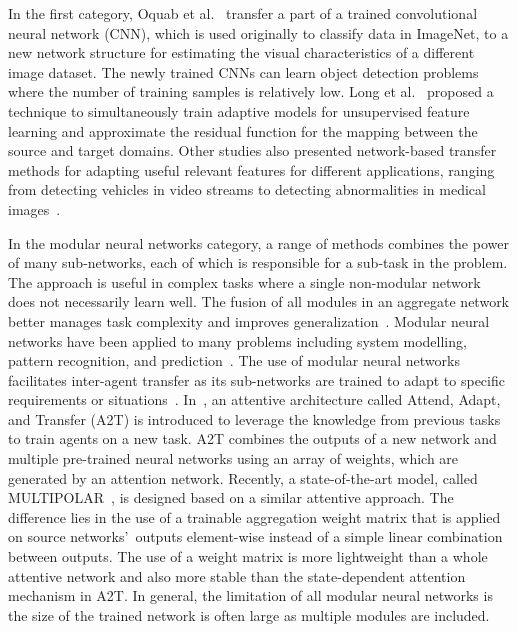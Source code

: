 \documentclass[lettersize,journal]{IEEEtran}
\begin{document}
In the first category, Oquab et al.~\cite{oquab2014learning} transfer a part of a trained convolutional neural network (CNN), which is used originally to classify data in ImageNet, to a new network structure for estimating the visual characteristics of a different image dataset. The newly trained CNNs can learn object detection problems where the number of training samples is relatively low. Long et al.~\cite{long2016unsupervised} proposed a technique to simultaneously train adaptive models for unsupervised feature learning and approximate the residual function for the mapping between the source and target domains. Other studies also presented network-based transfer methods for adapting useful relevant features for different applications, ranging from detecting vehicles in video streams to detecting abnormalities in medical images~\cite{wang2018vehicle,zhu2016deep,hassan2020developing}.

In the modular neural networks category, a range of methods combines the power of many sub-networks, each of which is responsible for a sub-task in the problem. The approach is useful in complex tasks where a single non-modular network does not necessarily learn well. The fusion of all modules in an aggregate network better manages task complexity and improves generalization~\cite{hu2020classifier}. Modular neural networks have been applied to many problems including system modelling, pattern recognition, and prediction~\cite{hu2020classifier,qiao2018design,li2019design}. The use of modular neural networks facilitates inter-agent transfer as its sub-networks are trained to adapt to specific requirements or situations~\cite{tommasino2016reinforcement}. In~\cite{rajendran2015attend}, an attentive architecture called Attend, Adapt, and Transfer (A2T)  is introduced to leverage the knowledge from previous tasks to train agents on a new task. A2T combines the outputs of a new network and multiple pre-trained neural networks using an array of weights, which are generated by an attention network. Recently, a state-of-the-art model, called MULTIPOLAR~\cite{barekatain2020multipolar}, is designed based on a similar attentive approach. The difference lies in the use of a trainable aggregation weight matrix that is applied on source networks\textquoteright \ outputs element-wise instead of a simple linear combination between outputs. The use of a weight matrix is more lightweight than a whole attentive network and also more stable than the state-dependent attention mechanism in A2T. In general, the limitation of all modular neural networks is the size of the trained network is often large as multiple modules are included.
\end{document}
